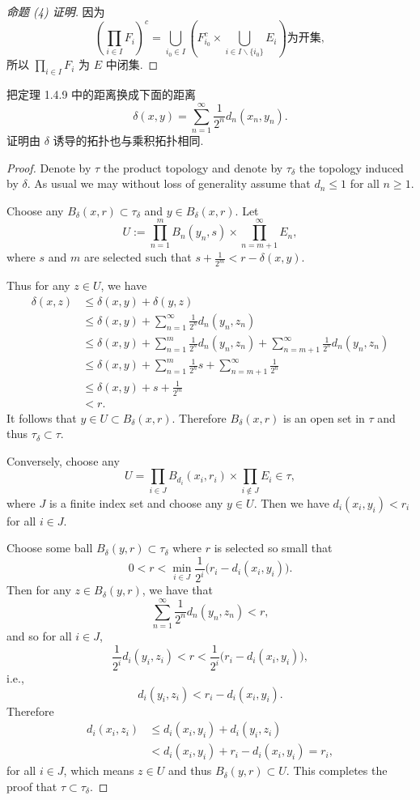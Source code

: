 \begin{proof}[命题 (4) 证明]
因为
\[\left(\prod_{i\in I}F_i\right)^c=\bigcup_{i_0\in I}\left(F_{i_0}^c\times\bigcup_{i\in I\backslash\{i_0\}}E_i\right)\text{为开集},\]
所以 $\prod_{i\in I}F_i$ 为 $E$ 中闭集.
\end{proof}


\begin{exercise}
    把定理 1.4.9 中的距离换成下面的距离
    \[\delta(x,y)=\sum_{n=1}^{\infty}\frac{1}{2^n}d_n(x_n,y_n).\]
    证明由 $\delta$ 诱导的拓扑也与乘积拓扑相同.
\end{exercise}

\begin{proof}
  Denote by $\tau$ the product topology and denote by $\tau_\delta$ the topology
  induced by $\delta$. As usual we may without loss of generality assume that $d_n\leq 1$
  for all $n\geq 1$.

  Choose any $B_{\delta}(x,r)\subset\tau_{\delta}$ and $y\in B_{\delta}(x,r)$.
  Let
  \[U:= \prod_{n=1}^m B_n(y_n,s) \times \prod_{n=m+1}^{\infty} E_n,\]
  where $s$ and $m$ are selected such that $s + \frac{1}{2^m} < r - \delta(x,y)$.

  Thus for any $z\in U$, we have
  \begin{align*}
    \delta(x,z)
    & \leq \delta(x,y) + \delta(y,z) \\
    & \leq \delta(x,y) + \sum_{n=1}^\infty \frac{1}{2^n} d_n(y_n, z_n) \\
    & \leq \delta(x,y) + \sum_{n=1}^m \frac{1}{2^n} d_n(y_n,z_n)
      +\sum_{n=m+1}^{\infty} \frac{1}{2^n} d_n(y_n, z_n) \\
    & \leq \delta(x,y) + \sum_{n=1}^m \frac{1}{2^n} s + \sum_{n=m+1}^{\infty} \frac{1}{2^n} \\
    & \leq \delta(x,y) + s + \frac{1}{2^m} \\
    & < r.
  \end{align*}
  It follows that $y\in U \subset B_\delta (x,r)$. Therefore $B_\delta(x,r)$
  is an open set in $\tau$ and thus $\tau_\delta \subset \tau$.

  Conversely, choose any
  \[U = \prod_{i\in J} B_{d_i}(x_i,r_i) \times \prod_{i\notin J} E_i \in \tau,\]
  where $J$ is a finite index set and choose any $y\in U$.
  Then we have $d_i(x_i, y_i) < r_i$ for all $i\in J$.

  Choose some ball $B_\delta(y,r) \subset \tau_\delta$ where
  $r$ is selected so small that
  \[0 < r < \min_{i\in J} \frac{1}{2^i} \bigl(r_i - d_i(x_i,y_i)\bigr).\]
  Then for any $z\in B_\delta (y,r)$, we have that
  \[\sum_{n=1}^\infty \frac{1}{2^n} d_n(y_n, z_n) < r,\]
  and so for all $i\in J$,
  \[\frac{1}{2^i} d_i(y_i, z_i) < r < \frac{1}{2^i} \bigl(r_i - d_i(x_i, y_i)\bigr),\]
  i.e.,
  \[d_i(y_i, z_i) < r_i - d_i(x_i, y_i).\]
  Therefore
  \begin{align*}
    d_i(x_i, z_i)
    & \leq d_i(x_i, y_i) + d_i(y_i, z_i) \\
    & < d_i(x_i, y_i) + r_i - d_i(x_i, y_i) = r_i,
  \end{align*}
  for all $i\in J$, which means $z\in U$ and thus $B_\delta(y,r)\subset U$.
  This completes the proof that $\tau\subset\tau_\delta$.
\end{proof}


